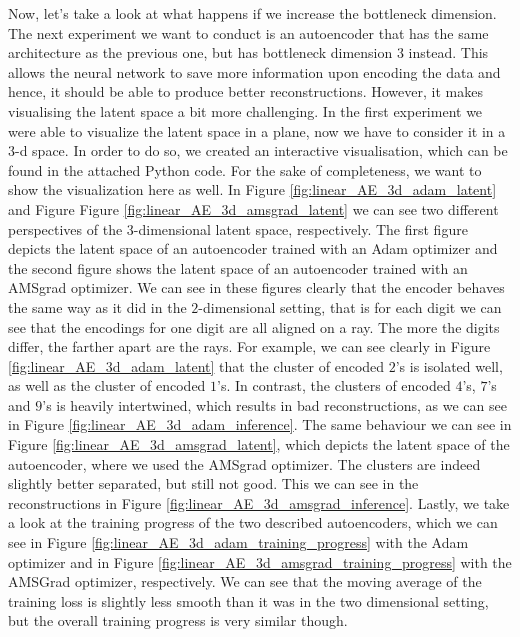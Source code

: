 Now, let's take a look at what happens if we increase the bottleneck dimension. The next experiment we want to conduct is an autoencoder that has the same architecture as the previous one, but has bottleneck dimension $3$ instead. This allows the neural network to save more information upon encoding the data and hence, it should be able to produce better reconstructions. However, it makes visualising the latent space a bit more challenging. In the first experiment we were able to visualize the latent space in a plane, now we have to consider it in a $3$-d space. In order to do so, we created an interactive visualisation, which can be found in the attached Python code. For the sake of completeness, we want to show the visualization here as well. In Figure \ref{fig:linear_AE_3d_adam_latent} and Figure Figure \ref{fig:linear_AE_3d_amsgrad_latent} we can see two different perspectives of the $3$-dimensional latent space, respectively. The first figure depicts the latent space of an autoencoder trained with an Adam optimizer and the second figure shows the latent space of an autoencoder trained with an AMSgrad optimizer. We can see in these figures clearly that the encoder behaves the same way as it did in the $2$-dimensional setting, that is for each digit we can see that the encodings for one digit are all aligned on a ray. The more the digits differ, the farther apart are the rays. For example, we can see clearly in Figure \ref{fig:linear_AE_3d_adam_latent} that the cluster of encoded $2$'s is isolated well, as well as the cluster of encoded $1$'s. In contrast, the clusters of encoded $4$'s, $7$'s and $9$'s is heavily intertwined, which results in bad reconstructions, as we can see in Figure \ref{fig:linear_AE_3d_adam_inference}. The same behaviour we can see in Figure \ref{fig:linear_AE_3d_amsgrad_latent}, which depicts the latent space of the autoencoder, where we used the AMSgrad optimizer. The clusters are indeed slightly better separated, but still not good. This we can see in the reconstructions in Figure \ref{fig:linear_AE_3d_amsgrad_inference}. Lastly, we take a look at the training progress of the two described autoencoders, which we can see in Figure \ref{fig:linear_AE_3d_adam_training_progress} with the Adam optimizer and in Figure \ref{fig:linear_AE_3d_amsgrad_training_progress} with the AMSGrad optimizer, respectively. We can see that the moving average of the training loss is slightly less smooth than it was in the two dimensional setting, but the overall training progress is very similar though.

